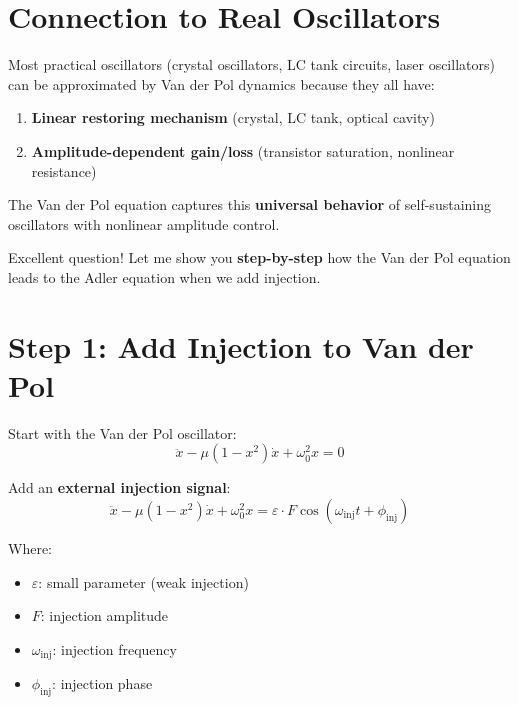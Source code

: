 \documentclass{article}
\begin{document}
\section{Connection to Real Oscillators}

Most practical oscillators (crystal oscillators, LC tank circuits, laser oscillators) can be approximated by Van der Pol dynamics because they all have:

\begin{enumerate}
    \item \textbf{Linear restoring mechanism} (crystal, LC tank, optical cavity)
    \item \textbf{Amplitude-dependent gain/loss} (transistor saturation, nonlinear resistance)
\end{enumerate}

The Van der Pol equation captures this \textbf{universal behavior} of self-sustaining oscillators with nonlinear amplitude control.



\vspace{2cm}

Excellent question! Let me show you \textbf{step-by-step} how the Van der Pol equation leads to the Adler equation when we add injection.

\section{Step 1: Add Injection to Van der Pol}

Start with the Van der Pol oscillator:
\begin{equation}
\ddot{x} - \mu(1 - x^2)\dot{x} + \omega_0^2 x = 0
\end{equation}

Add an \textbf{external injection signal}:
\begin{equation}
\ddot{x} - \mu(1 - x^2)\dot{x} + \omega_0^2 x = \varepsilon \cdot F \cos(\omega_{\text{inj}}t + \phi_{\text{inj}})
\end{equation}

Where:
\begin{itemize}
    \item $\varepsilon$: small parameter (weak injection)
    \item $F$: injection amplitude
    \item $\omega_{\text{inj}}$: injection frequency
    \item $\phi_{\text{inj}}$: injection phase
\end{itemize}
\end{document}
